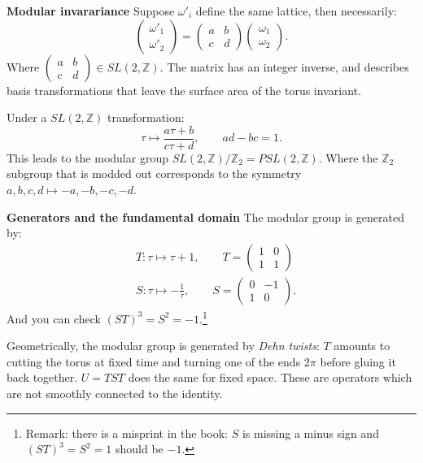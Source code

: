 \documentclass[submission, PhysLectNotes]{SciPost}
\begin{document}
{\bf Modular invarariance}
Suppose $\omega'_i$ define the same lattice, then necessarily:
\begin{equation}
\begin{pmatrix}
	\omega'_1\\
	\omega'_2
\end{pmatrix}
=
\begin{pmatrix}
	a & b\\
	c & d
\end{pmatrix}
\begin{pmatrix}
	\omega_1\\
	\omega_2
\end{pmatrix}.
\end{equation}
Where $\begin{pmatrix}
	a & b\\
	c & d
\end{pmatrix}\in SL(2,\mathbb{Z})$. The matrix has an integer inverse, and describes basis transformations that leave the surface area of the torus invariant.

Under a $SL(2,\mathbb{Z})$ transformation:
\begin{equation}
	\tau\mapsto\frac{a\tau + b}{c\tau +d},\qquad ad-bc=1.
\end{equation}
This leads to the modular group $SL(2,\mathbb{Z})/\mathbb{Z}_2=PSL(2,\mathbb{Z})$. Where the $\mathbb{Z}_2$ subgroup that is modded out corresponds to the symmetry $a,b,c,d\mapsto-a,-b,-c,-d$.


{\bf Generators and the fundamental domain}
The modular group is generated by:
\begin{align}
	&T:\tau\mapsto\tau +1,\qquad
	T =
	\begin{pmatrix}
		1 & 0\\
		1 & 1
	\end{pmatrix}\\
	&S:\tau\mapsto-\frac{1}{\tau},\qquad
	S =
	\begin{pmatrix}
		0 & -1\\
		1 & 0
	\end{pmatrix}.
\end{align}
And you can check $(ST)^3=S^2=-1$.\footnote{{\color{red}Remark:} there is a misprint in the book: $S$ is missing a minus sign and $(ST)^3=S^2=1$ should be $-1$.}

Geometrically, the modular group is generated by \emph{Dehn twists}: $T$ amounts to cutting the torus at fixed time and turning one of the ends $2\pi$ before gluing it back together. $U=TST$ does the same for fixed space. These are operators which are not smoothly connected to the identity.
\end{document}
